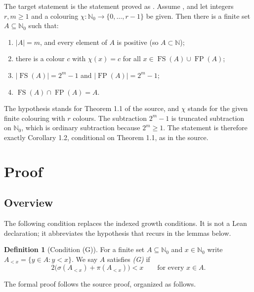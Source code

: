 \documentclass[11pt]{article}
\theoremstyle{definition}
\newtheorem{definition}[theorem]{Definition}
\theoremstyle{remark}
\newcommand{\leanname}[1]{\texttt{\detokenize{#1}}}
\DeclareMathOperator{\FS}{FS}
\DeclareMathOperator{\FP}{FP}
\newcommand{\NN}{\mathbb{N}}
\newcommand{\Nz}{\mathbb{N}_0}
\begin{document}
The target statement is the statement proved as \leanname{solution}. Assume \leanname{Thm11}, and let integers $r,m\ge 1$ and a colouring $\chi:\Nz\to\{0,\ldots,r-1\}$ be given. Then there is a finite set $A\subseteq\Nz$ such that:
\begin{enumerate}
 \item $|A|=m$, and every element of $A$ is positive (so $A\subset\NN$);
 \item there is a colour $c$ with $\chi(x)=c$ for all $x\in\FS(A)\cup\FP(A)$;
 \item $|\FS(A)|=2^m-1$ and $|\FP(A)|=2^m-1$;
 \item $\FS(A)\cap\FP(A)=A$.
\end{enumerate}

The hypothesis \leanname{Thm11} stands for Theorem 1.1 of the source, and $\chi$ stands for the given finite colouring with $r$ colours. The subtraction $2^m-1$ is truncated subtraction on $\Nz$, which is ordinary subtraction because $2^m\ge 1$. The statement is therefore exactly Corollary 1.2, conditional on Theorem 1.1, as in the source.

\section{Proof}

\subsection{Overview}

The following condition replaces the indexed growth conditions. It is not a Lean declaration; it abbreviates the hypothesis that recurs in the lemmas below.

\begin{definition}[Condition (G)]
For a finite set $A\subseteq\Nz$ and $x\in\Nz$ write $A_{<x}=\{y\in A: y<x\}$. We say $A$ satisfies \emph{(G)} if
\[
 2\bigl(\sigma(A_{<x})+\pi(A_{<x})\bigr)<x\qquad\text{for every }x\in A.
\]
\end{definition}

The formal proof follows the source proof, organized as follows.
\end{document}
